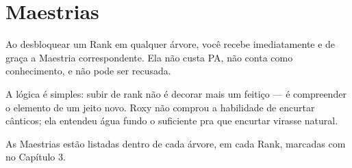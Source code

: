\section{Maestrias}

Ao desbloquear um Rank em qualquer árvore, você recebe imediatamente e de graça a Maestria
correspondente. Ela não custa PA, não conta como conhecimento, e não pode ser recusada.

A lógica é simples: subir de rank não é decorar mais um feitiço --- é compreender o
elemento de um jeito novo. Roxy não comprou a habilidade de encurtar cânticos; ela entendeu
água fundo o suficiente pra que encurtar virasse natural.

As Maestrias estão listadas dentro de cada árvore, em cada Rank, marcadas com
\simbmaestria{} no Capítulo 3.
